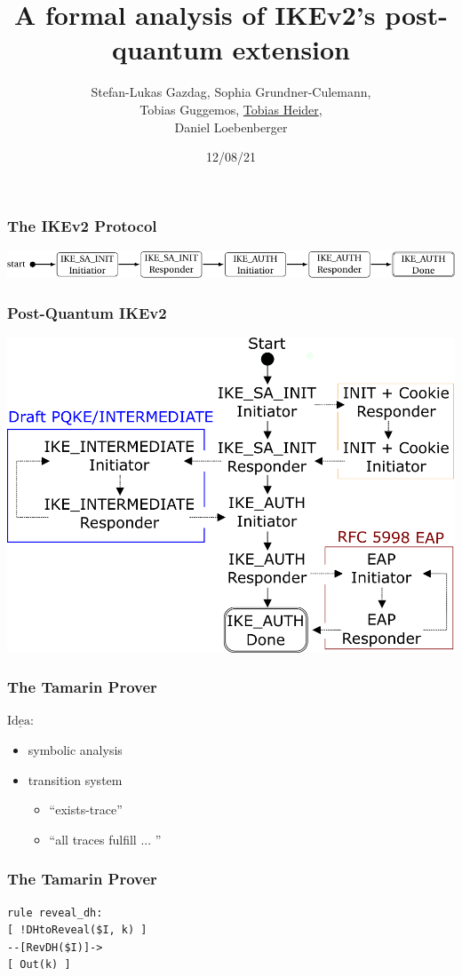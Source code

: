 \documentclass{beamer}
\title{A formal analysis of IKEv2's post-quantum extension}
\author{Stefan-Lukas Gazdag, Sophia Grundner-Culemann,\\
    Tobias Guggemos, \underline{Tobias Heider},\\
    Daniel Loebenberger}
\institute{ACSAC2021}
\date{12/08/21}
\begin{document}
\begin{frame}
	\titlepage
\end{frame}

\begin{frame}
\frametitle{The IKEv2 Protocol}
\includegraphics[width=\textwidth]{ike-state-machine.pdf}
\end{frame}

\begin{frame}
\frametitle{Post-Quantum IKEv2}
\includegraphics[width=\textwidth]{statemachine.pdf}
\end{frame}

\begin{frame}
\frametitle{The Tamarin Prover}
$\underline{\text{Idea:}}$  
\begin{itemize}
	\item symbolic analysis
	\item transition system
	\begin{itemize}
		\item ``exists-trace'' 
		\item ``all traces fulfill ... '' 
	\end{itemize}
\end{itemize}
\end{frame}

\begin{frame}[fragile]
\frametitle{The Tamarin Prover}
\begin{lstlisting}[language=Tamarin]
rule reveal_dh:
[ !DHtoReveal($I, k) ] 
--[RevDH($I)]->       
[ Out(k) ]   
\end{lstlisting}
\end{frame}
\end{document}
